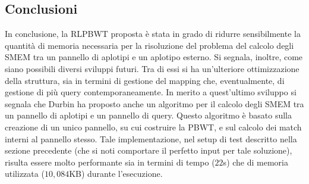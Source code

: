 \documentclass[a4paper,11pt, oneside,italian]{article}
\begin{document}
\subsection*{Conclusioni}
In conclusione, la RLPBWT proposta è stata in grado di ridurre sensibilmente la
quantità di memoria necessaria per la risoluzione del 
problema del calcolo degli SMEM tra un pannello di aplotipi e un aplotipo
esterno.  
Si segnala, inoltre, come siano possibili diversi sviluppi futuri. Tra di essi
si ha
un'ulteriore ottimizzazione della struttura, sia in termini 
di gestione del mapping che, eventualmente, di gestione di più query
contemporaneamente. In merito a quest'ultimo sviluppo si segnala che Durbin
ha proposto anche un algoritmo per il calcolo degli SMEM tra un pannello di
aplotipi e un pannello di query. Questo algoritmo è basato sulla creazione di un
unico pannello, su cui 
costruire la PBWT, e sul calcolo dei match interni al pannello stesso. Tale
implementazione, nel setup di test 
descritto nella sezione precedente (che si noti comportare il perfetto input per
tale soluzione), risulta essere molto performante sia in
termini di tempo ($22$s) che di memoria utilizzata ($10,084$KB) durante
l'esecuzione.  
\end{document}
